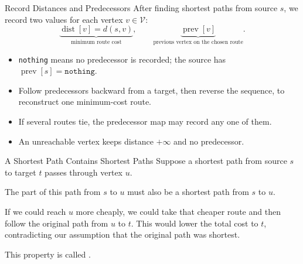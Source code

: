 \documentclass[aspectratio=169,11pt]{beamer}
\begin{document}
\begin{frame}{Record Distances and Predecessors}
  After finding shortest paths from source $s$, we record two values for each
  vertex $v\in\mathcal V$:
  \[
    \underbrace{\operatorname{dist}[v]=d(s,v)}_{\text{minimum route cost}},
    \qquad
    \underbrace{\operatorname{prev}[v]}_{\text{previous vertex on the chosen route}}.
  \]

  \vspace{0.7em}
  \begin{itemize}\setlength{\itemsep}{0.75em}
    \item \texttt{nothing} means no predecessor is recorded; the source has
      $\operatorname{prev}[s]=\texttt{nothing}$.
    \item Follow predecessors backward from a target, then reverse the sequence,
      to reconstruct one minimum-cost route.
    \item If several routes tie, the predecessor map may record any one of them.
    \item An unreachable vertex keeps distance $+\infty$ and no predecessor.
  \end{itemize}
\end{frame}

\begin{frame}{A Shortest Path Contains Shortest Paths}
  Suppose a shortest path from source $s$ to target $t$ passes through vertex $u$.

  \vspace{0.8em}
  The part of this path from $s$ to $u$ must also be a shortest path from $s$ to $u$.

  \vspace{0.8em}
  If we could reach $u$ more cheaply, we could take that cheaper route and then
  follow the original path from $u$ to $t$. This would lower the total cost to
  $t$, contradicting our assumption that the original path was shortest.

  \vspace{0.9em}
  \begin{center}
    \Large
    This property is called .
  \end{center}

\end{frame}
\end{document}
